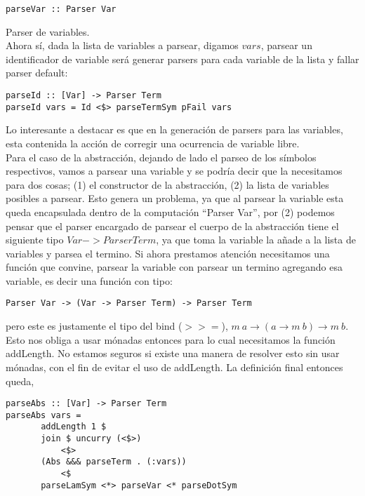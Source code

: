 \documentclass[a4paper,10pt]{article}
\begin{document}
\begin{lstlisting}
parseVar :: Parser Var
\end{lstlisting} Parser de variables.\\

Ahora sí, dada la lista de variables a parsear, digamos $vars$, parsear un
identificador de variable será generar parsers para cada variable de la lista
y fallar parser default:

\begin{lstlisting}
parseId :: [Var] -> Parser Term
parseId vars = Id <$> parseTermSym pFail vars
\end{lstlisting}

Lo interesante a destacar es que en la generación de parsers para las variables,
esta contenida la acción de corregir una ocurrencia de variable libre.\\

Para el caso de la abstracción, dejando de lado el parseo de los símbolos respectivos,
vamos a parsear una variable y se podría decir que la necesitamos para dos cosas;
(1) el constructor de la abstracción, (2) la lista de variables posibles a parsear.
Esto genera un problema, ya que al parsear la variable esta queda encapsulada 
dentro de la computación ``Parser Var'', por (2) podemos pensar que el parser encargado
de parsear el cuerpo de la abstracción tiene el siguiente tipo $Var -> Parser Term$,
ya que toma la variable la añade a la lista de variables y parsea el termino.
Si ahora prestamos atención necesitamos una función que convine, parsear la variable con
parsear un termino agregando esa variable, es decir una función con tipo:

\begin{lstlisting}
Parser Var -> (Var -> Parser Term) -> Parser Term
\end{lstlisting}

pero este es justamente el tipo del bind ($>>=$), $m \ a \rightarrow (a \rightarrow m \ b) \rightarrow m \ b$. Esto
nos obliga a usar mónadas entonces para lo cual necesitamos la función addLength.
No estamos seguros si existe una manera de resolver esto sin usar mónadas, con el
fin de evitar el uso de addLength. La definición final entonces queda,

\begin{lstlisting}
parseAbs :: [Var] -> Parser Term
parseAbs vars = 
       addLength 1 $
       join $ uncurry (<$>) 
           <$> 
       (Abs &&& parseTerm . (:vars))
       	   <$ 
       parseLamSym <*> parseVar <* parseDotSym
\end{lstlisting}
\end{document}
